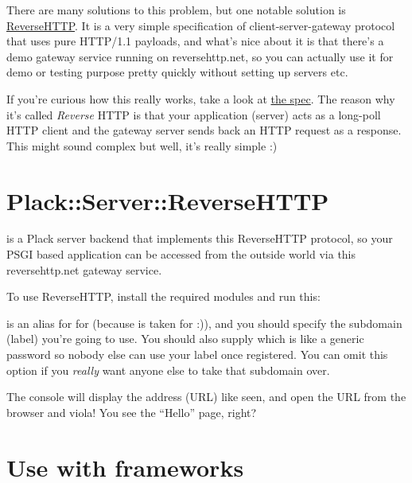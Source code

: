 There are many solutions to this problem, but one notable solution is
\href{http://www.reversehttp.net/}{ReverseHTTP}. It is a very simple
specification of client-server-gateway protocol that uses pure HTTP/1.1
payloads, and what's nice about it is that there's a demo gateway
service running on reversehttp.net, so you can actually use it for demo
or testing purpose pretty quickly without setting up servers etc.

If you're curious how this really works, take a look at
\href{http://www.reversehttp.net/specs.html}{the spec}. The reason why
it's called \emph{Reverse} HTTP is that your application (server) acts
as a long-poll HTTP client and the gateway server sends back an HTTP
request as a response. This might sound complex but well, it's really
simple :)

\section{Plack::Server::ReverseHTTP}\label{plackserverreversehttp}

\href{http://search.cpan.org/~miyagawa/Plack-Server-ReverseHTTP-0.01/}{}
is a Plack server backend that implements this ReverseHTTP protocol, so
your PSGI based application can be accessed from the outside world via
this reversehttp.net gateway service.

To use ReverseHTTP, install the required modules and run this:


 is an alias for  for  (because
 is taken for  :)), and you should
specify the subdomain (label) you're going to use. You should also
supply  which is like a generic password so nobody
else can use your label once registered. You can omit this option if you
\emph{really} want anyone else to take that subdomain over.

The console will display the address (URL) like seen, and open the URL
from the browser and viola! You see the ``Hello'' page, right?

\section{Use with frameworks}\label{use-with-frameworks}


